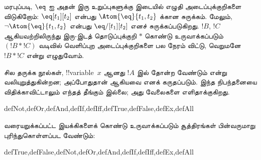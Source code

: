\documentclass[../../../include/open-logic-section]{subfiles}
\begin{document}
மரபுப்படி, $\eq$ ஐ அதன் இரு உறுப்புகளுக்கு இடையில் எழுதி அடைப்புக்குறிகளை
விடுகிறோம்: $\eq[t_1][t_2]$ என்பது $\Atom{\eq}{t_1,t_2}$ க்கான சுருக்கம்.
மேலும், $\lnot \Atom{\eq}{t_1,t_2}$ என்பது $\eq/[t_1][t_2]$ எனச்
சுருக்கப்படுகிறது. $!B$, $!C$ ஆகியவற்றிலிருந்து இரு-இடத் தொடுப்புக்குறி
$\ast$ கொண்டு உருவாக்கப்படும் $(!B \ast !C)$ வடிவில் வெளிப்புற அடைப்புக்குறிகளை
பல நேரம் விட்டு, வெறுமனே~$!B \ast !C$ என்று எழுதுவோம்.

\begin{intro}
சில தருக்க நூல்கள், !!{variable}~$x$ ஆனது $!A$ இல் தோன்ற வேண்டும் என்று
வலியுறுத்துகின்றன; அப்போதுதான்
%
%
%
ஆகியவை
 எனக் கருதப்படும்.
இந்த நிபந்தனையை விதிக்காவிட்டாலும் எந்தத் தீங்கும் இல்லை; அது வேலைகளை
எளிதாக்குகிறது.
\end{intro}

\begin{tagblock}{defNot,defOr,defAnd,defIf,defIff,defTrue,defFalse,defEx,defAll}
\begin{defn}
வரையறுக்கப்பட்ட இயக்கிகளைக் கொண்டு உருவாக்கப்படும் சூத்திரங்கள் பின்வருமாறு
புரிந்துகொள்ளப்பட வேண்டும்:

\begin{tagenumerate}{defTrue,defFalse,defNot,defOr,defAnd,defIf,defIff,defEx,defAll}









\end{tagenumerate}
\end{defn}
\end{tagblock}
\end{document}

